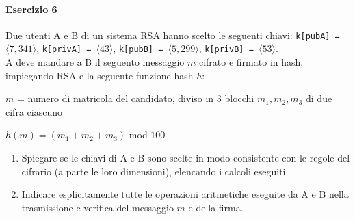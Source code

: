 \documentclass[10pt]{book}
\begin{document}
\paragraph{Esercizio 6} Due utenti A e B di un sistema RSA hanno scelto le seguenti chiavi: \texttt{k[pubA] = }$\langle 7,341\rangle$, \texttt{k[privA] = }$\langle43\rangle$, \texttt{k[pubB] = }$\langle5,299\rangle$, \texttt{k[privB] = }$\langle53\rangle$.\\
A deve mandare a B il seguento messaggio $m$ cifrato e firmato in hash, impiegando RSA e la seguente funzione hash $h$:
\begin{list}{}{}
	\item $m$ = numero di matricola del candidato, diviso in 3 blocchi $m_1,m_2,m_3$ di due cifra ciascuno
	\item $h(m) = (m_1+m_2+m_3)$ mod $100$
\end{list}
\begin{enumerate}
	\item Spiegare se le chiavi di A e B sono scelte in modo consistente con le regole del cifrario (a parte le loro dimensioni), elencando i calcoli eseguiti.
	\item Indicare esplicitamente tutte le operazioni aritmetiche eseguite da A e B nella trasmissione e verifica del messaggio $m$ e della firma.
\end{enumerate}
\end{document}
